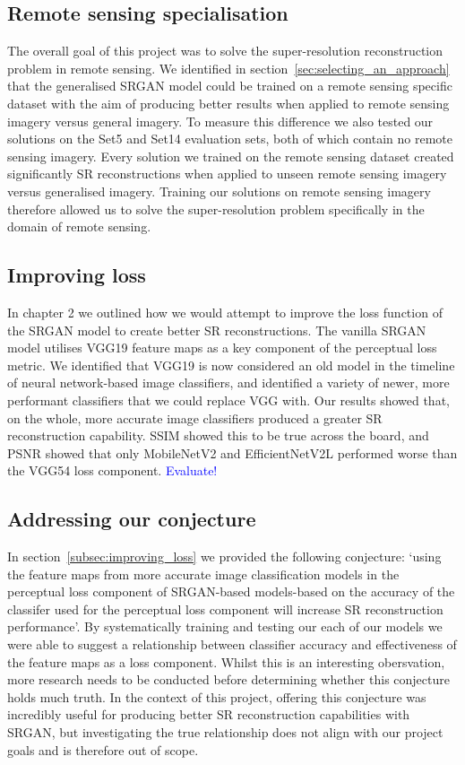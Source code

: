 \subsection{Remote sensing specialisation}
The overall goal of this project was to solve the super-resolution reconstruction problem in remote sensing. We identified in section~\ref{sec:selecting_an_approach} that the generalised SRGAN model could be trained on a remote sensing specific dataset with the aim of producing better results when applied to remote sensing imagery versus general imagery. To measure this difference we also tested our solutions on the Set5 and Set14 evaluation sets, both of which contain no remote sensing imagery. Every solution we trained on the remote sensing dataset created significantly SR reconstructions when applied to unseen remote sensing imagery versus generalised imagery. Training our solutions on remote sensing imagery therefore allowed us to solve the super-resolution problem specifically in the domain of remote sensing.

\subsection{Improving loss}
In chapter 2 we outlined how we would attempt to improve the loss function of the SRGAN model to create better SR reconstructions. The vanilla SRGAN model utilises VGG19 feature maps as a key component of the perceptual loss metric. We identified that VGG19 is now considered an old model in the timeline of neural network-based image classifiers, and identified a variety of newer, more performant classifiers that we could replace VGG with. Our results showed that, on the whole, more accurate image classifiers produced a greater SR reconstruction capability. SSIM showed this to be true across the board, and PSNR showed that only MobileNetV2 and EfficientNetV2L performed worse than the VGG54 loss component. \textcolor{blue}{Evaluate!}

\subsection{Addressing our conjecture}
In section~\ref{subsec:improving_loss} we provided the following conjecture: `using the feature maps from more
accurate image classification models in the perceptual loss component of SRGAN-based models-based on the accuracy of the classifer used for the perceptual loss component will increase SR reconstruction performance'. By systematically training and testing our each of our models we were able to suggest a relationship between classifier accuracy and effectiveness of the feature maps as a loss component. Whilst this is an interesting obersvation, more research needs to be conducted before determining whether this conjecture holds much truth. In the context of this project, offering this conjecture was incredibly useful for producing better SR reconstruction capabilities with SRGAN, but investigating the true relationship does not align with our project goals and is therefore out of scope.

